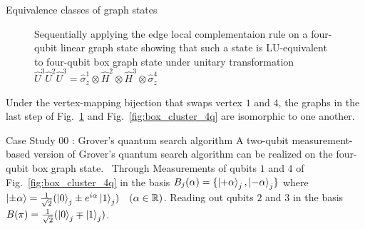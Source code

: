\documentclass[final]{beamer}
\newlength{\colwidth}
\begin{document}
\begin{frame}[t]
\begin{columns}[t]
\begin{column}{\colwidth}
\begin{block}{Equivalence classes of graph states}
\begin{figure}[H]
\begin{subfigure}[b]{0.25\textwidth}
                        \end{subfigure}
                        \caption{Sequentially applying the edge local complementaion
                            rule on a four-qubit linear graph state showing that such a
                            state is LU-equivalent to four-qubit box graph state under
                            unitary transformation $\hat{U}^{3}\hat{U}^{2}\hat{U}^{3} =
                            \hat{\sigma}^{1}_{z}\otimes\hat{H}^{2}\otimes\hat{H}^{3}\otimes\hat{\sigma}^{4}_z$}
                            \label{fig:edge_local_complementation_example}
                    \end{figure}

                    Under the vertex-mapping bijection that swaps vertex $1$ and $4$, the
                    graphs in the last step of
                    Fig.~\ref{fig:edge_local_complementation_example} and
                    Fig.~\ref{fig:box_cluster_4q} are isomorphic to one another.
                \end{block}
                \begin{block}{Case Study 00 : Grover's quantum search algorithm}
                    A two-qubit measurement-based version of Grover's quantum search algorithm can be realized
                    on the four-qubit box graph state.~\cite{Walther_2005}
                    Through Measurements of qubits $1$ and $4$ of Fig.~\ref{fig:box_cluster_4q} in the
                    basis $B_j(\alpha) = \{\ket{+\alpha}_j, \ket{-\alpha}_j\}$
                    where $\ket{\pm \alpha} = \frac{1}{\sqrt{2}}(\ket{0}_j \pm
                    e^{i\alpha}\ket{1}_j) \quad (\alpha \in \mathbb{R})$. Reading out
                    qubits $2$ and $3$ in the basis $B(\pi) =
                    \frac{1}{\sqrt{2}}(\ket{0}_j \mp \ket{1}_j)$.



\end{block}
\end{column}
\end{columns}
\end{frame}
\end{document}
